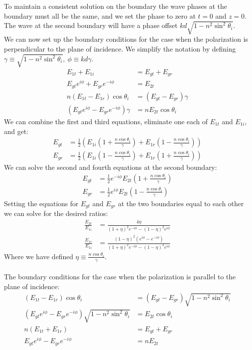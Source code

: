 \documentclass[a4paper,11pt]{article}
\numberwithin{equation}{section}
\newcommand{\lrp}[1]{\left({#1}\right)}
\begin{document}
To maintain a consistent solution on the boundary the wave phases at the boundary must all be the same, and we set the phase to zero at $t=0$ and $z=0$.
The wave at the second boundary will have a phase offset $kd \sqrt{1-n^2\sin^2{\theta_i}}$. \\
We can now set up the boundary conditions for the case when the polarization is perpendicular to the plane of incidence.
We simplify the notation by defining $\gamma \equiv \sqrt{1-n^2\sin^2{\theta_i}},\ \phi \equiv kd\gamma$.
\begin{align}
 E_{1t}+E_{1i} &= E_{gt}+E_{gr}\\
 E_{gt}e^{i\phi}+E_{gr}e^{-i\phi} &= E_{2t}\\
 n(E_{1t}-E_{1r})\cos{\theta_{i}} &= (E_{gt}-E_{gr})\gamma\\
 (E_{gt}e^{i\phi}-E_{gr}e^{-i\phi})\gamma &= nE_{2t}\cos{\theta_i}
\end{align}
We can combine the first and third equations, eliminate one each of $E_{1t}$ and $E_{1i}$, and get:
\begin{align}
 E_{gt} &= \frac{1}{2}\lrp{E_{1i}(1+\frac{n\cos{\theta_i}}{\gamma})+E_{1r}(1-\frac{n\cos{\theta_i}}{\gamma})}\\
 E_{gr} &= \frac{1}{2}\lrp{E_{1i}(1-\frac{n\cos{\theta_i}}{\gamma})+E_{1r}(1+\frac{n\cos{\theta_i}}{\gamma})}
\end{align}
We can solve the second and fourth equations at the second boundary:
\begin{align}
 E_{gt} &= \frac{1}{2}e^{-i\phi}E_{2t}\lrp{1+\frac{n\cos{\theta_i}}{\gamma}}\\
 E_{gr} &= \frac{1}{2}e^{i\phi}E_{2t}\lrp{1-\frac{n\cos{\theta_i}}{\gamma}}
\end{align}
Setting the equations for $E_{gt}$ and $E_{gr}$ at the two boundaries equal to each other we can solve for the desired ratios:
\begin{align}
 \frac{E_{2t}}{E_{1i}} &= \frac{4\eta}{(1+\eta)^2e^{-i\phi}-(1-\eta)^2e^{i\phi}}\\
 \frac{E_{1r}}{E_{1i}} &= \frac{(1-\eta)^2(e^{i\phi}-e^{-i\phi})}{(1+\eta)^2e^{-i\phi}-(1-\eta)^2e^{i\phi}}
\end{align}
Where we have defined $\eta \equiv \frac{n\cos{\theta_i}}{\gamma}$.
\\
\\
The boundary conditions for the case when the polarization is parallel to the plane of incidence:
\begin{align}
 (E_{1t}-E_{1r})\cos{\theta_i} &= (E_{gt}-E_{gr})\sqrt{1-n^2\sin^2{\theta_i}}\\
 (E_{gt}e^{i\phi}-E_{gr}e^{-i\phi})\sqrt{1-n^2\sin^2{\theta_i}} &= E_{2t}\cos{\theta_i}\\
 n(E_{1t}+E_{1r}) &= E_{gt}+E_{gr}\\
 E_{gt}e^{i\phi}-E_{gr}e^{-i\phi} &= nE_{2t}
\end{align}
\end{document}
